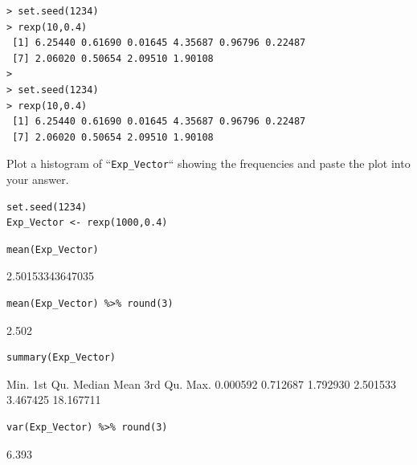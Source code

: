 \documentclass[a4paper,12pt]{article}
\begin{document}
\begin{verbatim}
> set.seed(1234)
> rexp(10,0.4)
 [1] 6.25440 0.61690 0.01645 4.35687 0.96796 0.22487
 [7] 2.06020 0.50654 2.09510 1.90108
> 
> set.seed(1234)
> rexp(10,0.4)
 [1] 6.25440 0.61690 0.01645 4.35687 0.96796 0.22487
 [7] 2.06020 0.50654 2.09510 1.90108    
\end{verbatim}






\newpage 
\noindent Plot a histogram of ``\texttt{Exp\_Vector}`` showing the frequencies and paste the plot into your answer.

\begin{framed} \begin{verbatim}
set.seed(1234)
Exp_Vector <- rexp(1000,0.4)
\end{verbatim}\end{framed}


\begin{framed} \begin{verbatim}
mean(Exp_Vector) 
\end{verbatim}\end{framed}


2.50153343647035



\begin{framed} \begin{verbatim}
mean(Exp_Vector) %>% round(3)
\end{verbatim}\end{framed}


2.502



\begin{framed} \begin{verbatim}
summary(Exp_Vector)
\end{verbatim}\end{framed}


         Min.   1st Qu.    Median      Mean   3rd Qu.      Max. 
     0.000592  0.712687  1.792930  2.501533  3.467425 18.167711 



\begin{framed} \begin{verbatim}
var(Exp_Vector) %>% round(3)
\end{verbatim}\end{framed}


6.393
\end{document}
